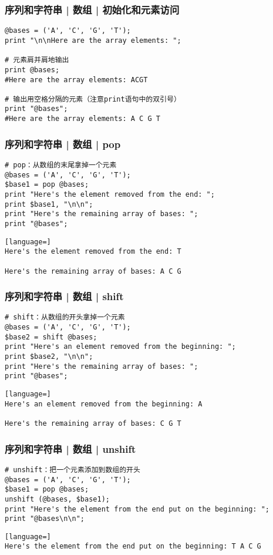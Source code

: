 \begin{frame}[fragile]
  \frametitle{序列和字符串 | 数组 | \alert{初始化和元素访问}}
  \vspace{-1.5em}
\begin{lstlisting}
@bases = ('A', 'C', 'G', 'T');
print "\n\nHere are the array elements: ";

# 元素肩并肩地输出
print @bases;
#Here are the array elements: ACGT

# 输出用空格分隔的元素（注意print语句中的双引号）
print "@bases";
#Here are the array elements: A C G T
\end{lstlisting}
\end{frame}

\begin{frame}[fragile]
  \frametitle{序列和字符串 | 数组 | \alert{pop}}
  \vspace{-1.5em}
\begin{lstlisting}
# pop：从数组的末尾拿掉一个元素
@bases = ('A', 'C', 'G', 'T');
$base1 = pop @bases;
print "Here's the element removed from the end: ";
print $base1, "\n\n";
print "Here's the remaining array of bases: ";
print "@bases";
\end{lstlisting}
\pause
\begin{lstlisting}[language=]
Here's the element removed from the end: T

Here's the remaining array of bases: A C G
\end{lstlisting}
\end{frame}

\begin{frame}[fragile]
  \frametitle{序列和字符串 | 数组 | \alert{shift}}
  \vspace{-1.5em}
\begin{lstlisting}
# shift：从数组的开头拿掉一个元素
@bases = ('A', 'C', 'G', 'T');
$base2 = shift @bases;
print "Here's an element removed from the beginning: ";
print $base2, "\n\n";
print "Here's the remaining array of bases: ";
print "@bases";
\end{lstlisting}
\pause
\begin{lstlisting}[language=]
Here's an element removed from the beginning: A

Here's the remaining array of bases: C G T
\end{lstlisting}
\end{frame}

\begin{frame}[fragile]
  \frametitle{序列和字符串 | 数组 | \alert{unshift}}
  \vspace{-1.5em}
\begin{lstlisting}
# unshift：把一个元素添加到数组的开头
@bases = ('A', 'C', 'G', 'T');
$base1 = pop @bases;
unshift (@bases, $base1);
print "Here's the element from the end put on the beginning: ";
print "@bases\n\n";
\end{lstlisting}
\pause
\begin{lstlisting}[language=]
Here's the element from the end put on the beginning: T A C G
\end{lstlisting}
\end{frame}

